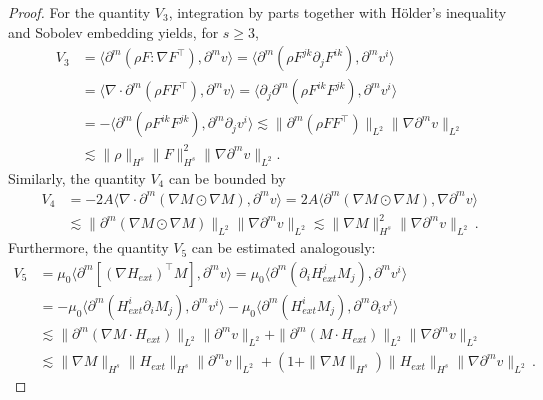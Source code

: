 \documentclass[reqno,11pt]{amsart}
\numberwithin{equation}{section}
\def\p{\partial}
\begin{document}
\begin{proof}
For the quantity $V_3$, integration by parts together with H\"older's inequality and Sobolev embedding yields, for $s \geq 3$,
\begin{equation}\label{v3-eq}
	\begin{aligned}
V_3 & =\langle \partial^m (\rho F: \nabla F^\top), \partial^m v \rangle = \langle \partial^m (\rho F^{jk} \partial_j F^{ik}), \partial^m v^i \rangle \\
& = \langle \nabla \cdot \partial^m (\rho F F^\top), \partial^m v \rangle = \langle \partial_j \partial^m (\rho F^{ik} F^{jk}), \partial^m v^i \rangle \\
& = -\langle \partial^m (\rho F^{ik} F^{jk}), \partial^m \partial_j v^i \rangle \lesssim\|\p^m(\rho FF^\top)\|_{L^2}\|\nabla\p^mv\|_{L^2} \\
& \lesssim\|\rho\|_{H^s}\|F\|^2_{H^s}\|\nabla\p^mv\|_{L^2}.
	\end{aligned}
\end{equation}
Similarly, the quantity $V_4$ can be bounded by
\begin{equation}\label{v4-eq}
	\begin{aligned}
V_4 & =- 2A\langle \nabla \cdot \partial^m (\nabla M \odot \nabla M), \partial^m v \rangle = 2A\langle \partial^m (\nabla M \odot  \nabla M), \nabla \partial^m v \rangle \\
& \lesssim \|\partial^m (\nabla M \odot  \nabla M)\|_{L^2} \|\nabla \partial^m v\|_{L^2} \lesssim \|\nabla M\|_{H^s}^2 \|\nabla \partial^m v\|_{L^2}\,.
	\end{aligned}
\end{equation}
Furthermore, the quantity $V_5$ can be estimated analogously:
\begin{equation}\label{v5-eq}
	\begin{aligned}
V_5& =\mu_0 \langle \partial^m [(\nabla H_{ext})^\top M], \partial^m v \rangle 
= \mu_0 \langle \partial^m (\partial_i H_{ext}^j M_j), \partial^m v^i \rangle \\&
= -\mu_0 \langle \partial^m (H_{ext}^i \partial_i M_j), \partial^m v^i \rangle
-\mu_0 \langle \partial^m (H_{ext}^i M_j), \partial^m \partial_i v^i \rangle \\&
\lesssim \|\partial^m (\nabla M \cdot H_{ext})\|_{L^2} \|\partial^m v\|_{L^2} + \|\partial^m (M \cdot H_{ext})\|_{L^2} \|\nabla \partial^m v\|_{L^2} \\&
\lesssim \|\nabla M\|_{H^s} \|H_{ext}\|_{H^s} \|\partial^m v\|_{L^2}  + (1 + \|\nabla M\|_{H^s}) \|H_{ext}\|_{H^s} \|\nabla \partial^m v\|_{L^2}\,.
	\end{aligned}
\end{equation}


\end{proof}
\end{document}
